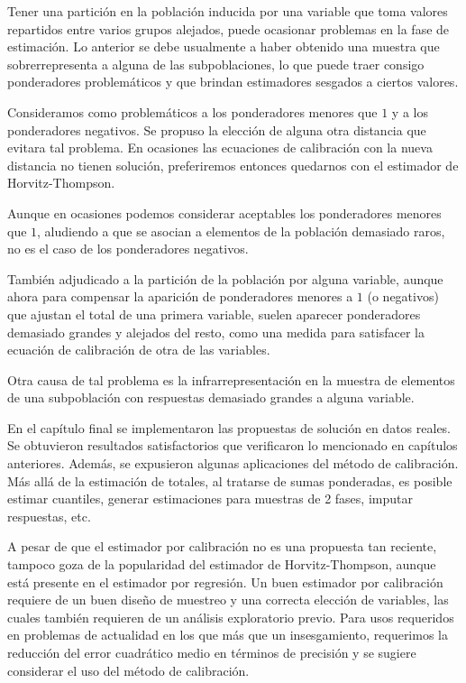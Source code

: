 \documentclass[a4paper,twoside,openright,12pt]{book}
\makeatletter
\renewcommand*{\cleardoublepage}{\clearpage\if@twoside \ifodd\c@page\else
\hbox{}%
\thispagestyle{empty}%
\newpage%
\if@twocolumn\hbox{}\newpage\fi\fi\fi}
\theoremstyle{definition}
\numberwithin{equation}{chapter}
\numberwithin{figure}{chapter}
\numberwithin{table}{chapter}
\numberwithin{theorem}{chapter}
\numberwithin{lemma}{chapter}
\makeatother
\begin{document}
Tener una partición en la población inducida por una variable que toma valores repartidos entre varios grupos alejados, puede ocasionar problemas en la fase de estimación. Lo anterior se debe usualmente a haber obtenido una muestra que sobrerrepresenta a alguna de las subpoblaciones, lo que puede traer consigo ponderadores problemáticos y que brindan estimadores sesgados a ciertos valores.

Consideramos como problemáticos a los ponderadores menores que $1$ y a los ponderadores negativos. Se propuso la elección de alguna otra distancia que evitara tal problema. En ocasiones las ecuaciones de calibración con la nueva distancia no tienen solución, preferiremos entonces quedarnos con el estimador de Horvitz-Thompson.

Aunque en ocasiones podemos considerar aceptables los ponderadores menores que $1$, aludiendo a que se asocian a elementos de la población demasiado raros, no es el caso de los ponderadores negativos.

También adjudicado a la partición de la población por alguna variable, aunque ahora para compensar la aparición de ponderadores menores a $1$ (o negativos) que ajustan el total de una primera variable, suelen aparecer ponderadores demasiado grandes y alejados del resto, como una medida para satisfacer la ecuación de calibración de otra de las variables.

Otra causa de tal problema es la infrarrepresentación en la muestra de elementos de una subpoblación con respuestas demasiado grandes a alguna variable.

En el capítulo final se implementaron las propuestas de solución en datos reales. Se obtuvieron resultados satisfactorios que verificaron lo mencionado en capítulos anteriores. Además, se expusieron algunas aplicaciones del método de calibración. Más allá de la estimación de totales, al tratarse de sumas ponderadas, es posible estimar cuantiles, generar estimaciones para muestras de 2 fases, imputar respuestas, etc.

A pesar de que el estimador por calibración no es una propuesta tan reciente, tampoco goza de la popularidad del estimador de Horvitz-Thompson, aunque está presente en el estimador por regresión. Un buen estimador por calibración requiere de un buen diseño de muestreo y una correcta elección de variables, las cuales también requieren de un análisis exploratorio previo. Para usos requeridos en problemas de actualidad en los que más que un insesgamiento, requerimos la reducción del error cuadrático medio en términos de precisión y se sugiere considerar el uso del método de calibración.
\appendix
\cleardoublepage
\addappheadtotoc\appendixpage
\end{document}
